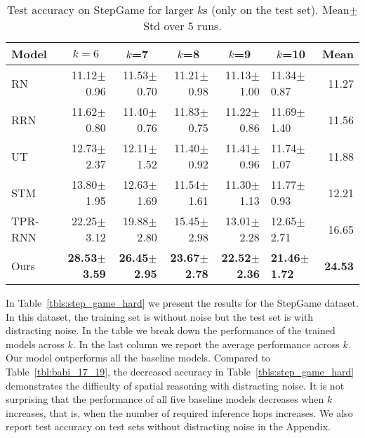 \documentclass[letterpaper]{article} \usepackage{aaai22}  \usepackage{times}  \usepackage{helvet}  \usepackage{courier}  \usepackage[hyphens]{url}  \usepackage{graphicx} \urlstyle{rm} \def\UrlFont{\rm}  \usepackage{natbib}  \usepackage{caption} \DeclareCaptionStyle{ruled}{labelfont=normalfont,labelsep=colon,strut=off} \frenchspacing  \setlength{\pdfpagewidth}{8.5in}  \setlength{\pdfpageheight}{11in}  \usepackage{algorithm}
\begin{document}
 \begin{table*}[!th]
\small
\centering
\begin{adjustbox}{max width=0.92\textwidth}
\begin{tabular}{l|rrrrl|r}
\hline
\hline
Model & \multicolumn{1}{c}{$k=6$} & \multicolumn{1}{c}{$k$=7} & \multicolumn{1}{c}{$k$=8} & \multicolumn{1}{c}{$k$=9} & \multicolumn{1}{c|}{$k$=10} & Mean \\ \hline
RN~\cite{santoro2017simple}       & 11.12$\pm$0.96 & 11.53$\pm$0.70 & 11.21$\pm$0.98 & 11.13$\pm$1.00 & 11.34$\pm$0.87 & 11.27 \\
RRN~\cite{palm2018recurrent}      & 11.62$\pm$0.80 & 11.40$\pm$0.76 & 11.83$\pm$0.75 & 11.22$\pm$0.86 & 11.69$\pm$1.40 & 11.56 \\
UT~\cite{dehghani2018universal}   & 12.73$\pm$2.37 & 12.11$\pm$1.52 & 11.40$\pm$0.92 & 11.41$\pm$0.96 & 11.74$\pm$1.07 & 11.88 \\
STM~\cite{le2020self}             & 13.80$\pm$1.95 & 12.63$\pm$1.69 & 11.54$\pm$1.61 & 11.30$\pm$1.13 & 11.77$\pm$0.93 & 12.21 \\
TPR-RNN~\cite{schlag2018learning} & 22.25$\pm$3.12 & 19.88$\pm$2.80 & 15.45$\pm$2.98 & 13.01$\pm$2.28 & 12.65$\pm$2.71 & 16.65 \\ \hline
Ours                              & \textbf{28.53$\pm$3.59}    & \textbf{26.45$\pm$2.95} & \textbf{23.67$\pm$2.78} & \textbf{22.52$\pm$2.36} & \textbf{21.46$\pm$1.72} & \textbf{24.53} \\ \hline
\hline
\end{tabular}
\end{adjustbox}
\caption{Test accuracy on StepGame for larger $k$s (only on the test set). Mean$\pm$Std over 5 runs.}
\label{tbl:step_game_hard_extra}
\end{table*} 
In Table~\ref{tbls:step_game_hard} we present the results for the StepGame dataset. 
In this dataset, the training set is without noise but the test set is with distracting noise.
In the table we break down the performance of the trained models across $k$. In the last column we report the average performance across $k$.
Our model outperforms all the baseline models. Compared to Table~\ref{tbl:babi_17_19}, the decreased accuracy in Table~\ref{tbls:step_game_hard} demonstrates the difficulty of spatial reasoning with distracting noise. It is not surprising that the performance of all five baseline models decreases when $k$ increases, that is, when the number of required inference hops increases. 
We also report test accuracy on test sets without distracting noise in the Appendix.
\end{document}
